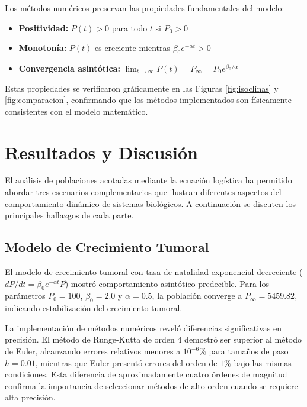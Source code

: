 \documentclass[a4paper,10pt,twocolumn]{article}
\begin{document}
Los métodos numéricos preservan las propiedades fundamentales del modelo:
\begin{itemize}
    \item \textbf{Positividad:} $P(t) > 0$ para todo $t$ si $P_0 > 0$
    \item \textbf{Monotonía:} $P(t)$ es creciente mientras $\beta_0 e^{-\alpha t} > 0$
    \item \textbf{Convergencia asintótica:} $\lim_{t \to \infty} P(t) = P_{\infty} = P_0 e^{\beta_0/\alpha}$
\end{itemize}

Estas propiedades se verificaron gráficamente en las Figuras \ref{fig:isoclinas} y \ref{fig:comparacion}, confirmando que los métodos implementados son físicamente consistentes con el modelo matemático.


\section{Resultados y Discusión}\label{sec:resultados}

El análisis de poblaciones acotadas mediante la ecuación logística ha permitido abordar tres escenarios complementarios que ilustran diferentes aspectos del comportamiento dinámico de sistemas biológicos. A continuación se discuten los principales hallazgos de cada parte.

\subsection{Modelo de Crecimiento Tumoral}\label{subsec:resultados-tumor}

El modelo de crecimiento tumoral con tasa de natalidad exponencial decreciente ($dP/dt = \beta_0 e^{-\alpha t} P$) mostró comportamiento asintótico predecible. Para los parámetros $P_0 = 100$, $\beta_0 = 2.0$ y $\alpha = 0.5$, la población converge a $P_{\infty} = 5459.82$, indicando estabilización del crecimiento tumoral.

La implementación de métodos numéricos reveló diferencias significativas en precisión. El método de Runge-Kutta de orden 4 demostró ser superior al método de Euler, alcanzando errores relativos menores a $10^{-6}\%$ para tamaños de paso $h = 0.01$, mientras que Euler presentó errores del orden de $1\%$ bajo las mismas condiciones. Esta diferencia de aproximadamente cuatro órdenes de magnitud confirma la importancia de seleccionar métodos de alto orden cuando se requiere alta precisión.
\end{document}
